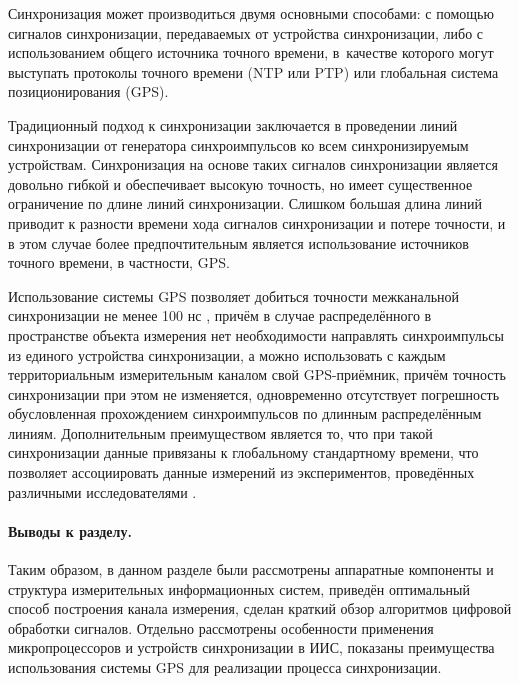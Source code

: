 \documentclass[a4paper, 14pt, titlepage]{extarticle}
\let\oldparagraph\paragraph
\renewcommand{\paragraph}[1]{\oldparagraph{\indent #1}}
\begin{document}
  Синхронизация может производиться двумя основными способами: с помощью сигналов синхронизации,
  передаваемых от устройства синхронизации, либо с использованием общего источника точного времени,
  в~качестве которого могут выступать протоколы точного времени (NTP или PTP) или глобальная система
  позиционирования (GPS).

  Традиционный подход к синхронизации заключается в проведении линий синхронизации от генератора
  синхроимпульсов ко всем синхронизируемым устройствам. Синхронизация на основе таких сигналов
  синхронизации является довольно гибкой и обеспечивает высокую точность, но имеет существенное
  ограничение по длине линий синхронизации. Слишком большая длина линий приводит к разности времени
  хода сигналов синхронизации и потере точности, и в этом случае более предпочтительным является
  использование источников точного времени, в частности, GPS.


  Использование системы GPS
  позволяет добиться точности межканальной синхронизации не менее 100 нс \cite{lombardi-gps}, причём в случае
  распределённого в пространстве объекта измерения нет необходимости направлять синхроимпульсы из
  единого устройства синхронизации, а можно использовать с каждым территориальным измерительным
  каналом свой GPS-приёмник, причём точность синхронизации при этом не изменяется,
  одновременно отсутствует погрешность обусловленная прохождением синхроимпульсов по длинным
  распределённым линиям. Дополнительным преимуществом является то, что при такой синхронизации
  данные привязаны к глобальному стандартному времени, что позволяет ассоциировать данные измерений
  из экспериментов, проведённых различными исследователями \cite{veggeberg-sync}.


  \paragraph{Выводы к разделу.}
  Таким образом, в данном разделе были рассмотрены аппаратные компоненты и структура измерительных
  информационных систем, приведён оптимальный способ построения канала измерения, сделан
  краткий обзор алгоритмов цифровой обработки сигналов. Отдельно
  рассмотрены особенности применения микропроцессоров и устройств синхронизации в ИИС,
  показаны преимущества использования системы GPS для реализации процесса синхронизации.
\end{document}
